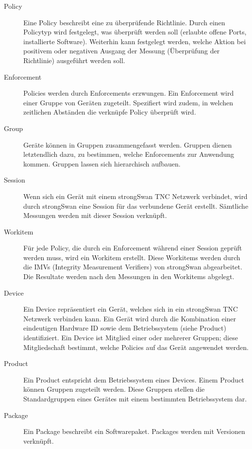 \begin{description}
	\item[Policy] Eine Policy beschreibt eine zu überprüfende Richtlinie. Durch
	einen Policytyp wird festgelegt, was überprüft werden soll (\zb erlaubte offene
	Ports, installierte Software). Weiterhin kann festgelegt werden, welche Aktion
	bei positivem oder negativen Ausgang der Messung (Überprüfung der Richtlinie)
	ausgeführt werden soll.
	
	\item[Enforcement] Policies werden durch Enforcements erzwungen. Ein
	Enforcement wird einer Gruppe von Geräten zugeteilt. Spezifiert wird zudem, in
	welchen zeitlichen Abständen die verknüpfe Policy überprüft wird.

	\item[Group] Geräte können in Gruppen zusammengefasst werden. Gruppen dienen
	letztendlich dazu, zu bestimmen, welche Enforcements zur Anwendung kommen.
	Gruppen lassen sich hierarchisch aufbauen.

	\item[Session] Wenn sich ein Gerät mit einem strongSwan TNC Netzwerk verbindet,
	wird durch strongSwan eine Session für das verbundene Gerät erstellt. Sämtliche
	Messungen werden mit dieser Session verknüpft.

	\item[Workitem] Für jede Policy, die durch ein Enforcement während einer
	Session geprüft werden muss, wird ein Workitem erstellt. Diese Workitems werden
	durch die IMVs (Integrity Measurement Verifiers) von strongSwan abgearbeitet.
	Die Resultate werden nach den Messungen in den Workitems abgelegt.

	\item[Device] Ein Device repräsentiert ein Gerät, welches sich in ein
	strongSwan TNC Netzwerk verbinden kann. Ein Gerät wird durch die Kombination
	einer eindeutigen Hardware ID sowie dem Betriebssystem (siehe Product)
	identifiziert. Ein Device ist Mitglied einer oder mehrerer Gruppen; diese
	Mitgliedschaft bestimmt, welche Policies auf das Gerät angewendet werden.

	\item[Product] Ein Product entspricht dem Betriebssystem eines Devices. Einem
	Product können Gruppen zugeteilt werden. Diese Gruppen stellen die
	Standardgruppen eines Gerätes mit einem bestimmten Betriebssystem dar.

	\item[Package] Ein Package beschreibt ein Softwarepaket. Packages werden mit
	Versionen verknüpft.


\end{description}

